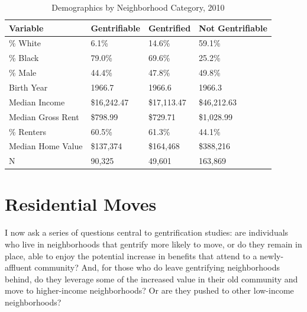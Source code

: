 \documentclass[
  12pt,
]{article}
\begin{document}
\begin{singlespace}
\begin{table}[!h]

\caption{\label{tab:pre-demo-tab-full}\label{tab:pre-demos} Demographics by Neighborhood Category, 2010}
\centering
\begin{tabular}[t]{llll}
\toprule
Variable & Gentrifiable & Gentrified & Not Gentrifiable\\
\midrule
\% White & 6.1\% & 14.6\% & 59.1\%\\
\% Black & 79.0\% & 69.6\% & 25.2\%\\
\% Male & 44.4\% & 47.8\% & 49.8\%\\
Birth Year & 1966.7 & 1966.6 & 1966.3\\
Median Income & \$16,242.47 & \$17,113.47 & \$46,212.63\\
Median Gross Rent & \$798.99 & \$729.71 & \$1,028.99\\
\% Renters & 60.5\% & 61.3\% & 44.1\%\\
Median Home Value & \$137,374 & \$164,468 & \$388,216\\
N & 90,325 & 49,601 & 163,869\\
\bottomrule
\end{tabular}
\end{table}
\end{singlespace}

\hypertarget{residential-moves}{%
\section*{Residential Moves}\label{residential-moves}}

I now ask a series of questions central to gentrification studies: are individuals who live in neighborhoods that gentrify more likely to move, or do they remain in place, able to enjoy the potential increase in benefits that attend to a newly-affluent community? And, for those who do leave gentrifying neighborhoods behind, do they leverage some of the increased value in their old community and move to higher-income neighborhoods? Or are they pushed to other low-income neighborhoods?
\end{document}
